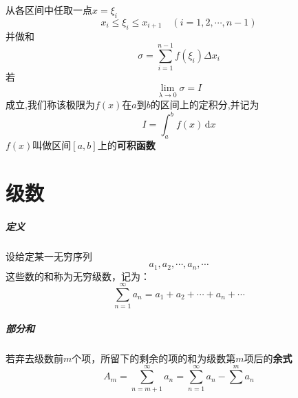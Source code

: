 \documentclass[12pt,a4paper]{report}
\begin{document}
从各区间中任取一点$x=\xi_{i}$
$$x_i \leq \xi_i \leq x_{i+1} \quad (i=1,2,\cdots,n-1)$$
并做和
$$
\sigma=\sum_{i=1}^{n-1} f(\xi_i) \Delta x_i
$$
若
$$
\lim_{\lambda \rightarrow 0} \sigma =I
$$
成立,我们称该极限为$f(x)$在$a$到$b$的区间上的定积分,并记为
$$
I=\int_a^b f(x) \, \mathrm{d}x
$$
$f(x)$叫做区间$[a,b]$上的\textbf{可积函数}
\chapter{级数}
\paragraph{定义}
设给定某一无穷序列
$$
a_1,a_2,\cdots,a_n,\cdots
$$
这些数的和称为无穷级数，记为：
$$
\sum_{n=1}^{\infty} a_n =a_1+a_2+\cdots+a_n+\cdots
$$

\paragraph{部分和}
若弃去级数前$m$个项，所留下的剩余的项的和为级数第$m$项后的\textbf{余式}
$$
    A_m=\sum_{n=m+1}^{\infty} a_n=\sum_{n=1}^{\infty} a_n - \sum^{m} a_n
$$
\end{document}
